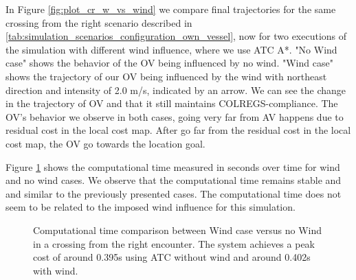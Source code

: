         In Figure \ref{fig:plot_cr_w_vs_wind} we compare final trajectories for the same crossing from the right scenario described in \ref{tab:simulation_scenarios_configuration_own_vessel}, now for two executions of the simulation with different wind influence, where we use \ac{ATC} A*. "No Wind case" shows the behavior of the \ac{OV} being influenced by no wind. "Wind case" shows the trajectory of our \ac{OV} being influenced by the wind with northeast direction and intensity of 2.0 m/s, indicated by an arrow. We can see the change in the trajectory of \ac{OV} and that it still maintains \ac{COLREGS}-compliance. The \ac{OV}'s behavior we observe in both cases, going very far from \ac{AV} happens due to residual cost in the local cost map. After go far from the residual cost in the local cost map, the \ac{OV} go towards the location goal.
        
        
        Figure \ref{fig:plot_cr_w_vs_wind_CT} shows the computational time measured in seconds over time for wind and no wind cases. We observe that the computational time remains stable and and similar to the previously presented cases. The computational time does not seem to be related to the imposed wind influence for this simulation.
        \begin{figure}[H]
            \centering
            
            \caption{Computational time comparison between Wind case versus no Wind in a crossing from the right encounter. The system achieves a peak cost of around 0.395s using \ac{ATC} without wind and around 0.402s with wind.}
            \label{fig:plot_cr_w_vs_wind_CT}
        \end{figure}
        
